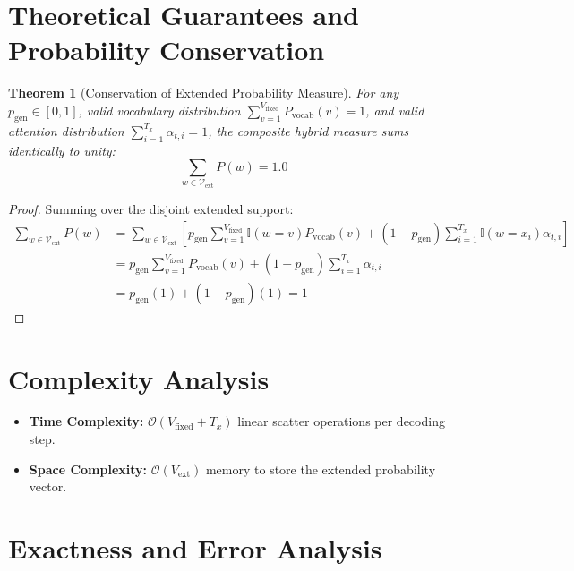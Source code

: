 \documentclass[11pt,a4paper]{article}
\newtheorem{theorem}{Theorem}
\theoremstyle{definition}
\begin{document}
\section{Theoretical Guarantees and Probability Conservation}

\begin{theorem}[Conservation of Extended Probability Measure]
\label{thm:copy_measure}
For any $p_{\text{gen}} \in [0, 1]$, valid vocabulary distribution $\sum_{v=1}^{V_{\text{fixed}}} P_{\text{vocab}}(v) = 1$, and valid attention distribution $\sum_{i=1}^{T_x} \alpha_{t, i} = 1$, the composite hybrid measure sums identically to unity:
\begin{equation}
\sum_{w \in \mathcal{V}_{\text{ext}}} P(w) = 1.0
\end{equation}
\end{theorem}

\begin{proof}
Summing over the disjoint extended support:
\begin{align}
\sum_{w \in \mathcal{V}_{\text{ext}}} P(w) &= \sum_{w \in \mathcal{V}_{\text{ext}}} \left[ p_{\text{gen}} \sum_{v=1}^{V_{\text{fixed}}} \mathbb{I}(w = v) P_{\text{vocab}}(v) + (1 - p_{\text{gen}}) \sum_{i=1}^{T_x} \mathbb{I}(w = x_i) \alpha_{t, i} \right] \\
&= p_{\text{gen}} \sum_{v=1}^{V_{\text{fixed}}} P_{\text{vocab}}(v) + (1 - p_{\text{gen}}) \sum_{i=1}^{T_x} \alpha_{t, i} \\
&= p_{\text{gen}}(1) + (1 - p_{\text{gen}})(1) = 1
\end{align}
\end{proof}

\section{Complexity Analysis}

\begin{itemize}
    \item \textbf{Time Complexity:} $\mathcal{O}(V_{\text{fixed}} + T_x)$ linear scatter operations per decoding step.
    \item \textbf{Space Complexity:} $\mathcal{O}(V_{\text{ext}})$ memory to store the extended probability vector.
\end{itemize}

\section{Exactness and Error Analysis}
\end{document}
